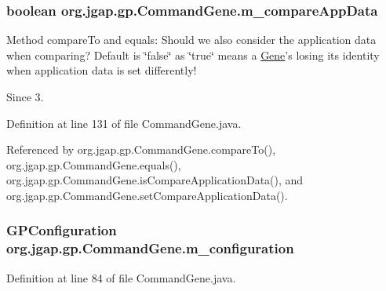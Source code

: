\hypertarget{classorg_1_1jgap_1_1gp_1_1_command_gene_ae1553ab72b757d9999f3556d7ed187ba}{
\subsubsection[{m\-\_\-compare\-App\-Data}]{\setlength{\rightskip}{0pt plus 5cm}boolean org.\-jgap.\-gp.\-Command\-Gene.\-m\-\_\-compare\-App\-Data\hspace{0.3cm}{\ttfamily [private]}}}\label{classorg_1_1jgap_1_1gp_1_1_command_gene_ae1553ab72b757d9999f3556d7ed187ba}
Method compare\-To and equals\-: Should we also consider the application data when comparing? Default is \char`\"{}false\char`\"{} as \char`\"{}true\char`\"{} means a \hyperlink{interfaceorg_1_1jgap_1_1_gene}{Gene}'s losing its identity when application data is set differently!

\begin{DoxySince}{Since}
3. 
\end{DoxySince}


Definition at line 131 of file Command\-Gene.\-java.



Referenced by org.\-jgap.\-gp.\-Command\-Gene.\-compare\-To(), org.\-jgap.\-gp.\-Command\-Gene.\-equals(), org.\-jgap.\-gp.\-Command\-Gene.\-is\-Compare\-Application\-Data(), and org.\-jgap.\-gp.\-Command\-Gene.\-set\-Compare\-Application\-Data().

\hypertarget{classorg_1_1jgap_1_1gp_1_1_command_gene_a6ae8e74ae5261a7e70b8879dec8eac96}{
\subsubsection[{m\-\_\-configuration}]{\setlength{\rightskip}{0pt plus 5cm}G\-P\-Configuration org.\-jgap.\-gp.\-Command\-Gene.\-m\-\_\-configuration\hspace{0.3cm}{\ttfamily [private]}}}\label{classorg_1_1jgap_1_1gp_1_1_command_gene_a6ae8e74ae5261a7e70b8879dec8eac96}


Definition at line 84 of file Command\-Gene.\-java.



